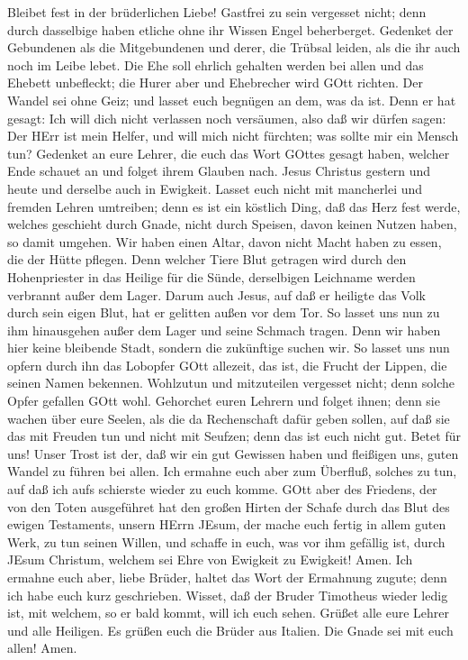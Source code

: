  Bleibet fest in der brüderlichen Liebe! 
Gastfrei zu sein vergesset nicht; denn durch dasselbige haben etliche
ohne ihr Wissen Engel beherberget.  Gedenket der Gebundenen
als die Mitgebundenen und derer, die Trübsal leiden, als die ihr auch
noch im Leibe lebet.  Die Ehe soll ehrlich gehalten werden
bei allen und das Ehebett unbefleckt; die Hurer aber und Ehebrecher wird
GOtt richten.  Der Wandel sei ohne Geiz; und lasset euch
begnügen an dem, was da ist. Denn er hat gesagt: Ich will dich nicht
verlassen noch versäumen,  also daß wir dürfen sagen: Der
HErr ist mein Helfer, und will mich nicht fürchten; was sollte mir ein
Mensch tun?  Gedenket an eure Lehrer, die euch das Wort
GOttes gesagt haben, welcher Ende schauet an und folget ihrem Glauben
nach.  Jesus Christus gestern und heute und derselbe auch in
Ewigkeit.  Lasset euch nicht mit mancherlei und fremden
Lehren umtreiben; denn es ist ein köstlich Ding, daß das Herz fest
werde, welches geschieht durch Gnade, nicht durch Speisen, davon keinen
Nutzen haben, so damit umgehen.  Wir haben einen Altar,
davon nicht Macht haben zu essen, die der Hütte pflegen. 
Denn welcher Tiere Blut getragen wird durch den Hohenpriester in das
Heilige für die Sünde, derselbigen Leichname werden verbrannt außer dem
Lager.  Darum auch Jesus, auf daß er heiligte das Volk
durch sein eigen Blut, hat er gelitten außen vor dem Tor. 
So lasset uns nun zu ihm hinausgehen außer dem Lager und seine Schmach
tragen.  Denn wir haben hier keine bleibende Stadt, sondern
die zukünftige suchen wir.  So lasset uns nun opfern durch
ihn das Lobopfer GOtt allezeit, das ist, die Frucht der Lippen, die
seinen Namen bekennen.  Wohlzutun und mitzuteilen vergesset
nicht; denn solche Opfer gefallen GOtt wohl.  Gehorchet
euren Lehrern und folget ihnen; denn sie wachen über eure Seelen, als
die da Rechenschaft dafür geben sollen, auf daß sie das mit Freuden tun
und nicht mit Seufzen; denn das ist euch nicht gut.  Betet
für uns! Unser Trost ist der, daß wir ein gut Gewissen haben und
fleißigen uns, guten Wandel zu führen bei allen.  Ich
ermahne euch aber zum Überfluß, solches zu tun, auf daß ich aufs
schierste wieder zu euch komme.  GOtt aber des Friedens,
der von den Toten ausgeführet hat den großen Hirten der Schafe durch das
Blut des ewigen Testaments, unsern HErrn JEsum,  der mache
euch fertig in allem guten Werk, zu tun seinen Willen, und schaffe in
euch, was vor ihm gefällig ist, durch JEsum Christum, welchem sei Ehre
von Ewigkeit zu Ewigkeit! Amen.  Ich ermahne euch aber,
liebe Brüder, haltet das Wort der Ermahnung zugute; denn ich habe euch
kurz geschrieben.  Wisset, daß der Bruder Timotheus wieder
ledig ist, mit welchem, so er bald kommt, will ich euch sehen.
 Grüßet alle eure Lehrer und alle Heiligen. Es grüßen euch
die Brüder aus Italien.  Die Gnade sei mit euch allen!
Amen.
